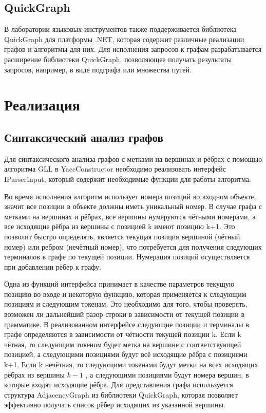 \documentclass[14pt]{matmex-diploma}
\begin{document}
\subsection{QuickGraph}

В лаборатории языковых инструментов также поддерживается библиотека QuickGraph для платформы .NET, которая содержит различные реализации графов и алгоритмы для них. Для исполнения запросов к графам разрабатывается расширение библиотеки QuickGraph, позволяющее получать результаты запросов, например, в виде подграфа или множества путей.

\section{Реализация}

\subsection{Синтаксический анализ графов}
Для синтаксического анализа графов с метками на вершинах и рёбрах с помощью алгоритма GLL в YaccConstructor необходимо реализовать интерфейс IParserInput, который содержит необходимые функции для работы алгоритма.

Во время исполнения алгоритм использует номера позиций во входном объекте, значит все позиции в объекте должны иметь уникальный номер. В случае графа с метками на вершинах и рёбрах, все вершины нумеруются чётными номерами, а все исходящие рёбра из вершины с позицией k имеют позицию k+1. Это позволит быстро определять, является текущая позиция вершиной (чётный номер) или ребром (нечётный номер), что потребуется для получения следующих терминалов в графе по текущей позиции. Нумерация позиций осуществляется при добавлении рёбер к графу.

Одна из функций интерфейса принимает в качестве параметров текущую позицию во входе и некоторую функцию, которая применяется к следующим позициям и следующим токенам. Это необходимо для того, чтобы проверять, возможен ли дальнейший разор строки в зависимости от текущей позиции в грамматике. В реализованном интерфейсе следующие позиции и терминалы в графе определяются в зависимости от чётности текущей позиции k. Если k чётная, то следующим токеном будет метка на вершине с соответствующей позицией, а  следующими позициями будут всё исходящие рёбра с позициями k+1. Если k нечётная, то следующими токенами будут метки на всех исходящих рёбрах из вершины $k-1$ , а следующими позициями будут номера вершин, в которые входят исходящие рёбра. Для представления графа используется структура AdjacencyGraph из библиотеки QuickGraph, которая позволяет эффективно получать список рёбер исходящих из указанной вершины.
\end{document}
